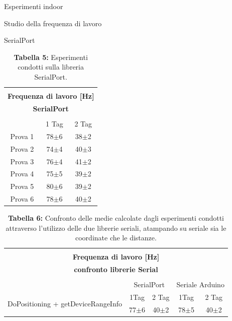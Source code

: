 \documentclass[12pt]{report}
\begin{document}
\begin{section}{Esperimenti indoor}
\begin{subsection}{Studio della frequenza di lavoro}
\begin{subsubsection}{SerialPort}
			\begin{table}[h]
				\centering
				\begin{tabular}{|c|c|c|}
					\hline
					\multicolumn{3}{|c|}{}\\
					\multicolumn{3}{|c|}{\textbf{\Large Frequenza di lavoro [Hz]}}\\
					\multicolumn{3}{|c|}{\textbf{\Large SerialPort}}\\
					\multicolumn{3}{|c|}{}\\
					\hline
					&								1 Tag&						2 Tag\\
					\hline
					Prova 1&					78$\pm$6&				38$\pm$2\\
					\hline
					Prova 2&					74$\pm$4&				40$\pm$3\\
					\hline
					Prova 3&					76$\pm$4&				41$\pm$2\\
					\hline
					Prova 4&					75$\pm$5&				39$\pm$2\\
					\hline
					Prova 5&					80$\pm$6&				39$\pm$2\\
					\hline
					Prova 6&					78$\pm$6&				40$\pm$2\\
					\hline 				
				\end{tabular}
				\caption{\textbf{Tabella 5: } Esperimenti condotti sulla libreria SerialPort.\label{Tserialport}}
		\end{table}

		\begin{table}[h]
			\centering
			\begin{tabular}{|c|c|c|c|c|}
						\hline
						\multicolumn{5}{|c|}{}\\
						\multicolumn{5}{|c|}{\textbf{\Large Frequenza di lavoro [Hz]}}\\
						\multicolumn{5}{|c|}{\textbf{\Large confronto librerie Serial}}\\
						\multicolumn{5}{|c|}{}\\
						\hline
						&																															\multicolumn{2}{|c|}{SerialPort}&														\multicolumn{2}{|c|}{Seriale Arduino}\\
						\hline
						\multirow{2}{*}{DoPositioning + getDeviceRangeInfo}&				1Tag&							2 Tag&															1Tag&							2 Tag\\
						\cline{2-5}
						&																																77$\pm$6&					40$\pm$2&													78$\pm$5&					40$\pm$2\\
						\hline
			\end{tabular}
			\caption{\textbf{Tabella 6: } Confronto delle medie calcolate dagli esperimenti condotti attraverso l'utilizzo delle due librerie seriali, atampando su seriale sia le coordinate che le distanze.\label{Tserialportconfronto}}
		\end{table}


\end{subsubsection}
\end{subsection}
\end{section}
\end{document}
